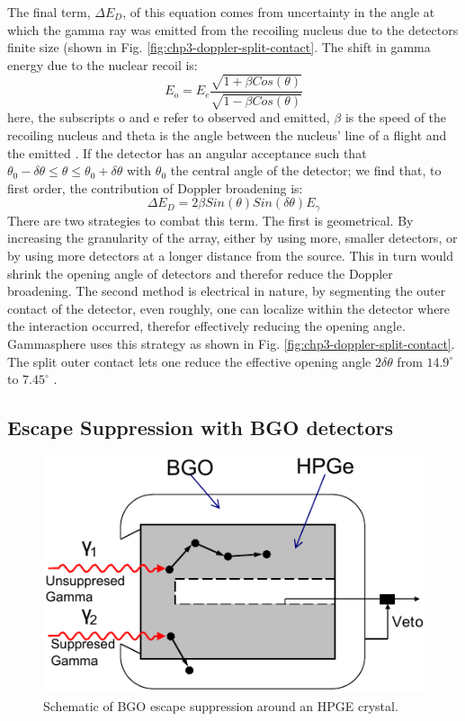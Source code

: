 The final term, $\Delta{}E_{D}$, of this equation comes from uncertainty in the angle at which the gamma ray was emitted from the recoiling nucleus due to the detectors finite size (shown in Fig. \ref{fig:chp3-doppler-split-contact}. The shift in gamma energy due to the nuclear recoil is:
\begin{equation}
\label{eqn:doppler_formula} 
E_{o} = E_{e}\frac{\sqrt{1+\beta{}Cos(\theta)}}{\sqrt{1-\beta{}Cos(\theta)}}
\end{equation}
here, the subscripts o and e refer to observed and emitted, $\beta$ is the speed of the recoiling nucleus and theta is the angle between the nucleus' line of a flight and the emitted \gr{}. If the detector has an angular acceptance such that $\theta{}_{0}-\delta{}\theta{}\leq{}\theta{}\leq{}\theta{}_{0}+\delta{}\theta{}$ with $\theta{}_{0}$ the central angle of the detector; we find that, to first order, the contribution of Doppler broadening is:
\begin{equation}
\label{eqn:res-doppler-term} 
\Delta{}E_{D} = 2\beta{}Sin(\theta{})Sin(\delta{}\theta{})E_{\gamma}
\end{equation}
There are two strategies to combat this term. The first is geometrical. By increasing the granularity of the array, either by using more, smaller detectors, or by using more detectors at a longer distance from the source. This in turn would shrink the opening angle of detectors and therefor reduce the Doppler broadening. The second method is electrical in nature, by segmenting the outer contact of the detector, even roughly, one can localize within the detector where the interaction occurred, therefor effectively reducing the opening angle. Gammasphere uses this strategy as shown in Fig. \ref{fig:chp3-doppler-split-contact}. The split outer contact lets one reduce the effective opening angle $2\delta{}\theta{}$ from $14.9^{\circ}$ to $7.45^{\circ}$ \cite{TheGS}.

\subsection{Escape Suppression with BGO detectors}
\label{ssec:exp-pr-gamma-spec-escape-supress}
\begin{figure}
	\centerline{\includegraphics[height=0.25\textheight]{./img/c3/BGO_schematic.pdf}}
	\caption{Schematic of BGO escape suppression around an HPGE crystal.}
	\label{fig:chp3-supression-schematic}
\end{figure}


